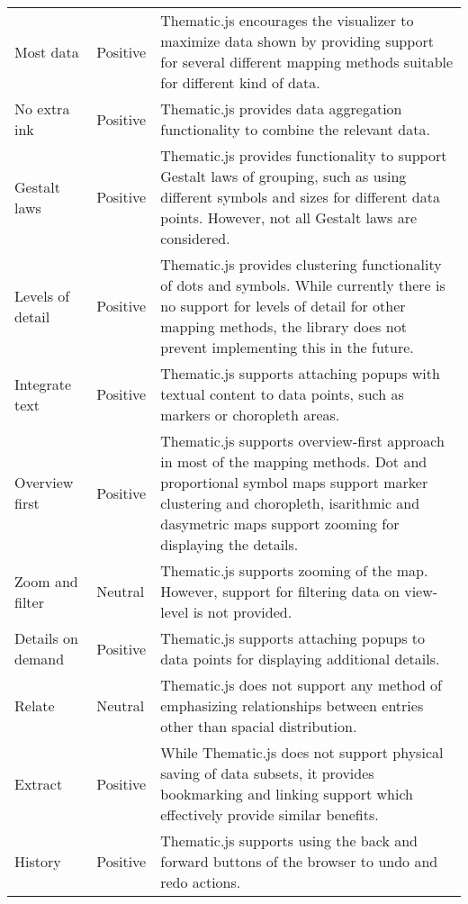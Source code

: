 \begin{longtable}{|p{3cm}|p{2.2cm}|p{7.8cm}|}
Most data & Positive & Thematic.js encourages the visualizer to maximize data shown by providing support for several different mapping methods suitable for different kind of data. \\[0.5em] %
No extra ink & Positive & Thematic.js provides data aggregation functionality to combine the relevant data. \\[0.5em] %
Gestalt laws & Positive & Thematic.js provides functionality to support Gestalt laws of grouping, such as using different symbols and sizes for different data points. However, not all Gestalt laws are considered. \\[0.5em] %
Levels of detail & Positive & Thematic.js provides clustering functionality of dots and symbols. While currently there is no support for levels of detail for other mapping methods, the library does not prevent implementing this in the future. \\[0.5em] %
Integrate text & Positive & Thematic.js supports attaching popups with textual content to data points, such as markers or choropleth areas. \\[0.5em]
Overview first & Positive & Thematic.js supports overview-first approach in most of the mapping methods. Dot and proportional symbol maps support marker clustering and choropleth, isarithmic and dasymetric maps support zooming for displaying the details. \\[0.5em] %
Zoom and filter & Neutral & Thematic.js supports zooming of the map. However, support for filtering data on view-level is not provided. \\[0.5em]
Details on demand & Positive & Thematic.js supports attaching popups to data points for displaying additional details. \\[0.5em]
Relate & Neutral & Thematic.js does not support any method of emphasizing relationships between entries other than spacial distribution. \\[0.5em] %
Extract & Positive & While Thematic.js does not support physical saving of data subsets, it provides bookmarking and linking support which effectively provide similar benefits. \\[0.5em] %
History & Positive & Thematic.js supports using the back and forward buttons of the browser to undo and redo actions. \\[0.5em] %

\end{longtable}
